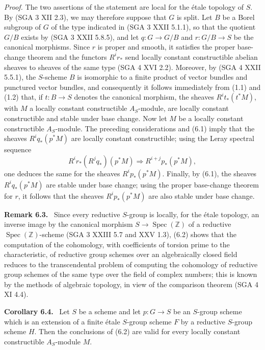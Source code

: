 \documentclass[11pt]{article}
\newenvironment{statement}[1]{\par\medskip\noindent\textbf{#1.}\ }{\par\medskip}
\begin{document}
\emph{Proof.} The two assertions of the statement are local for the étale topology of $S$. By (SGA 3 XII 2.3), we may therefore suppose that $G$ is split. Let $B$ be a Borel subgroup of $G$ of the type indicated in (SGA 3 XXII 5.1.1), so that the quotient $G/B$ exists by (SGA 3 XXII 5.8.5), and let $q:G\to G/B$ and $r:G/B\to S$ be the canonical morphisms. Since $r$ is proper and smooth, it satisfies the proper base-change theorem and the functors $R^ir_*$ send locally constant constructible abelian sheaves to sheaves of the same type (SGA 4 XVI 2.2). Moreover, by (SGA 4 XXII 5.5.1), the $S$-scheme $B$ is isomorphic to a finite product of vector bundles and punctured vector bundles, and consequently it follows immediately from (1.1) and (1.2) that, if $t:B\to S$ denotes the canonical morphism, the sheaves $R^it_*(t^*M)$, with $M$ a locally constant constructible $A_S$-module, are locally constant constructible and stable under base change. Now let $M$ be a locally constant constructible $A_S$-module. The preceding considerations and (6.1) imply that the sheaves $R^iq_*(p^*M)$ are locally constant constructible; using the Leray spectral sequence
\[
R^ir_*(R^jq_*)(p^*M)\Rightarrow R^{i+j}p_*(p^*M),
\]
one deduces the same for the sheaves $R^ip_*(p^*M)$. Finally, by (6.1), the sheaves $R^iq_*(p^*M)$ are stable under base change; using the proper base-change theorem for $r$, it follows that the sheaves $R^ip_*(p^*M)$ are also stable under base change.

\begin{statement}{Remark 6.3}
Since every reductive $S$-group is locally, for the étale topology, an inverse image by the canonical morphism $S\to\operatorname{Spec}(\mathbb Z)$ of a reductive $\operatorname{Spec}(\mathbb Z)$-scheme (SGA 3 XXIII 5.7 and XXV 1.3), (6.2) shows that the computation of the cohomology, with coefficients of torsion prime to the characteristic, of reductive group schemes over an algebraically closed field reduces to the transcendental problem of computing the cohomology of reductive group schemes of the same type over the field of complex numbers; this is known by the methods of algebraic topology, in view of the comparison theorem (SGA 4 XI 4.4).
\end{statement}

\begin{statement}{Corollary 6.4}
Let $S$ be a scheme and let $p:G\to S$ be an $S$-group scheme which is an extension of a finite étale $S$-group scheme $F$ by a reductive $S$-group scheme $H$. Then the conclusions of (6.2) are valid for every locally constant constructible $A_S$-module $M$.
\end{statement}
\end{document}
